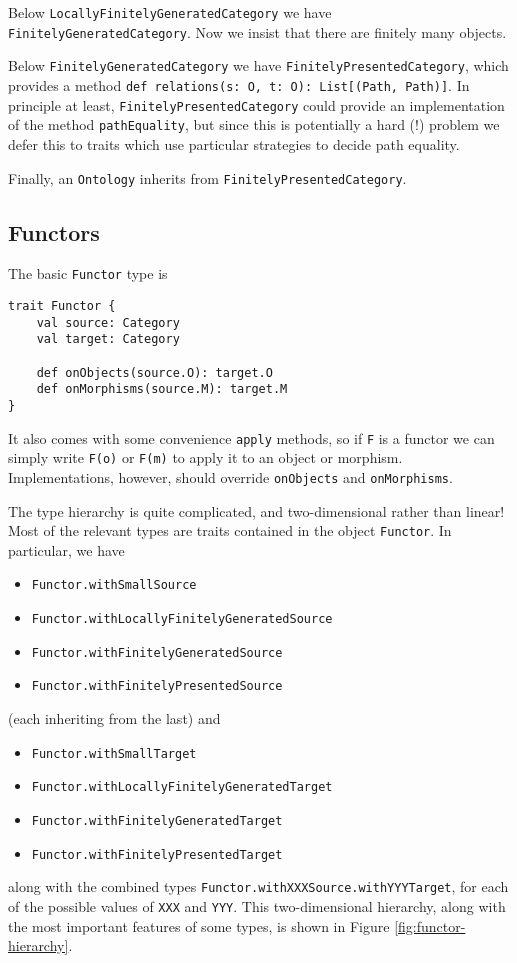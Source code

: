 \documentclass{amsart}
\newcommand{\type}[1]{{\tt #1}}
\newcommand{\code}[1]{{\tt #1}}
\begin{document}
Below \type{LocallyFinitelyGeneratedCategory} we have \type{FinitelyGeneratedCategory}. Now we insist that there are finitely many objects.

Below \type{FinitelyGeneratedCategory} we have \type{FinitelyPresentedCategory}, which provides a method \code{def relations(s: O, t: O): List[(Path, Path)]}. In principle at least, \type{FinitelyPresentedCategory} could provide an implementation of the method \code{pathEquality}, but since this is potentially a hard (!) problem we defer this to traits which use particular strategies to decide path equality.

Finally, an \type{Ontology} inherits from \type{FinitelyPresentedCategory}.

\subsection{Functors}
The basic \type{Functor} type is
\begin{verbatim}
trait Functor {
    val source: Category
    val target: Category
    
    def onObjects(source.O): target.O
    def onMorphisms(source.M): target.M
}
\end{verbatim}

It also comes with some convenience \code{apply} methods, so if \code{F} is a functor we can simply write \code{F(o)} or \code{F(m)} to apply it to an object or morphism. Implementations, however, should override \code{onObjects} and \code{onMorphisms}.

The type hierarchy is quite complicated, and two-dimensional rather than linear! Most of the relevant types are traits contained in the object \type{Functor}. In particular, we have
\begin{itemize}
\item \type{Functor.withSmallSource}
\item \type{Functor.withLocallyFinitelyGeneratedSource}
\item \type{Functor.withFinitelyGeneratedSource}
\item \type{Functor.withFinitelyPresentedSource}
\end{itemize}
(each inheriting from the last) and 
\begin{itemize}
\item \type{Functor.withSmallTarget}
\item \type{Functor.withLocallyFinitelyGeneratedTarget}
\item \type{Functor.withFinitelyGeneratedTarget}
\item \type{Functor.withFinitelyPresentedTarget}
\end{itemize}
along with the combined types \code{Functor.withXXXSource.withYYYTarget}, for each of the possible values of \code{XXX} and \code{YYY}. This two-dimensional hierarchy, along with the most important features of some types, is shown in Figure \ref{fig:functor-hierarchy}.
\end{document}
